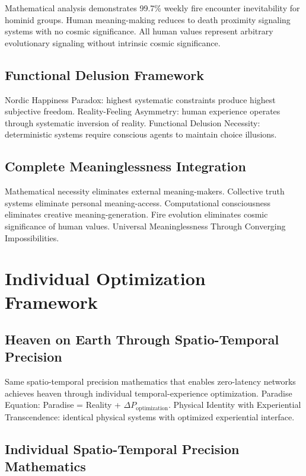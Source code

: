 \documentclass[12pt,a4paper]{article}
\begin{document}
Mathematical analysis demonstrates 99.7\% weekly fire encounter inevitability for hominid groups. Human meaning-making reduces to death proximity signaling systems with no cosmic significance. All human values represent arbitrary evolutionary signaling without intrinsic cosmic significance.

\subsection{Functional Delusion Framework}

Nordic Happiness Paradox: highest systematic constraints produce highest subjective freedom. Reality-Feeling Asymmetry: human experience operates through systematic inversion of reality. Functional Delusion Necessity: deterministic systems require conscious agents to maintain choice illusions.

\subsection{Complete Meaninglessness Integration}

Mathematical necessity eliminates external meaning-makers. Collective truth systems eliminate personal meaning-access. Computational consciousness eliminates creative meaning-generation. Fire evolution eliminates cosmic significance of human values. Universal Meaninglessness Through Converging Impossibilities.

\section{Individual Optimization Framework}

\subsection{Heaven on Earth Through Spatio-Temporal Precision}

Same spatio-temporal precision mathematics that enables zero-latency networks achieves heaven through individual temporal-experience optimization. Paradise Equation: Paradise = Reality + $\Delta P_{\text{optimization}}$. Physical Identity with Experiential Transcendence: identical physical systems with optimized experiential interface.

\subsection{Individual Spatio-Temporal Precision Mathematics}
\end{document}
